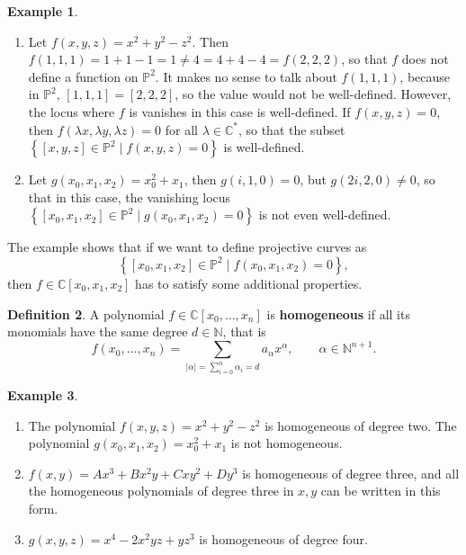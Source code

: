 \documentclass{article}
\newcommand{\N}{\mathbb{N}}
\newcommand{\C}{\mathbb{C}}
\renewcommand{\P}{\mathbb{P}}
\newcommand{\rb}[1]{\left( #1 \right)}
\renewcommand{\sb}[1]{\left[ #1 \right]}
\newcommand{\cb}[1]{\left\{ #1 \right\}}
\newcommand{\abs}[1]{\left\lvert #1 \right\rvert}
\theoremstyle{definition}\newtheorem{definition}{Definition}[section]
\theoremstyle{definition}\newtheorem{notation}[definition]{Notation}
\theoremstyle{definition}\newtheorem{remark}[definition]{Remark}
\theoremstyle{definition}\newtheorem{example}[definition]{Example}
\theoremstyle{definition}\newtheorem{fact}{Fact}
\theoremstyle{definition}\newtheorem{exercise}{Exercise}
\begin{document}
\begin{example}
\hfill
\begin{enumerate}
\item Let $ f\rb{x, y, z} = x^2 + y^2 - z^2 $. Then $ f\rb{1, 1, 1} = 1 + 1 - 1 = 1 \ne 4 = 4 + 4 - 4 = f\rb{2, 2, 2} $, so that $ f $ does not define a function on $ \P^2 $. It makes no sense to talk about $ f\rb{1, 1, 1} $, because in $ \P^2 $, $ \sb{1, 1, 1} = \sb{2, 2, 2} $, so the value would not be well-defined. However, the locus where $ f $ is vanishes in this case is well-defined. If $ f\rb{x, y, z} = 0 $, then $ f\rb{\lambda x, \lambda y, \lambda z} = 0 $ for all $ \lambda \in \C^* $, so that the subset $ \cb{\sb{x, y, z} \in \P^2 \mid f\rb{x, y, z} = 0} $ is well-defined.
\item Let $ g\rb{x_0, x_1, x_2} = x_0^2 + x_1 $, then $ g\rb{i, 1, 0} = 0 $, but $ g\rb{2i, 2, 0} \ne 0 $, so that in this case, the vanishing locus $ \cb{\sb{x_0, x_1, x_2} \in \P^2 \mid g\rb{x_0, x_1, x_2} = 0} $ is not even well-defined.
\end{enumerate}
\end{example}

The example shows that if we want to define projective curves as
$$ \cb{\sb{x_0, x_1, x_2} \in \P^2 \mid f\rb{x_0, x_1, x_2} = 0}, $$
then $ f \in \C\sb{x_0, x_1, x_2} $ has to satisfy some additional properties.

\begin{definition}
A polynomial $ f \in \C\sb{x_0, \dots, x_n} $ is \textbf{homogeneous} if all its monomials have the same degree $ d \in \N $, that is
$$ f\rb{x_0, \dots, x_n} = \sum_{\abs{\alpha} = \sum_{i = 0}^n \alpha_i = d} a_\alpha x^\alpha, \qquad \alpha \in \N^{n + 1}. $$
\end{definition}

\begin{example}
\hfill
\begin{enumerate}
\item The polynomial $ f\rb{x, y, z} = x^2 + y^2 - z^2 $ is homogeneous of degree two. The polynomial $ g\rb{x_0, x_1, x_2} = x_0^2 + x_1 $ is not homogeneous.
\item $ f\rb{x, y} = Ax^3 + Bx^2y + Cxy^2 + Dy^3 $ is homogeneous of degree three, and all the homogeneous polynomials of degree three in $ x, y $ can be written in this form.
\item $ g\rb{x, y, z} = x^4 - 2x^2yz + yz^3 $ is homogeneous of degree four.
\end{enumerate}
\end{example}
\end{document}
